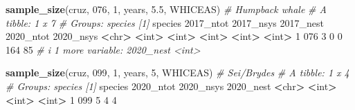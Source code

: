 \documentclass[
]{book}
\newenvironment{Shaded}{\begin{snugshade}}{\end{snugshade}}
\newcommand{\AttributeTok}[1]{\textcolor[rgb]{0.13,0.29,0.53}{#1}}
\newcommand{\CommentTok}[1]{\textcolor[rgb]{0.56,0.35,0.01}{\textit{#1}}}
\newcommand{\DecValTok}[1]{\textcolor[rgb]{0.00,0.00,0.81}{#1}}
\newcommand{\ErrorTok}[1]{\textcolor[rgb]{0.64,0.00,0.00}{\textbf{#1}}}
\newcommand{\FloatTok}[1]{\textcolor[rgb]{0.00,0.00,0.81}{#1}}
\newcommand{\FunctionTok}[1]{\textcolor[rgb]{0.13,0.29,0.53}{\textbf{#1}}}
\newcommand{\NormalTok}[1]{#1}
\newcommand{\SpecialCharTok}[1]{\textcolor[rgb]{0.81,0.36,0.00}{\textbf{#1}}}
\newcommand{\StringTok}[1]{\textcolor[rgb]{0.31,0.60,0.02}{#1}}
\begin{document}
\begin{Shaded}
\begin{Highlighting}[]
\FunctionTok{sample\_size}\NormalTok{(cruz, }\StringTok{\textquotesingle{}076\textquotesingle{}}\NormalTok{, }\DecValTok{1}\NormalTok{, years, }\FloatTok{5.5}\NormalTok{, }\StringTok{\textquotesingle{}WHICEAS\textquotesingle{}}\NormalTok{) }\CommentTok{\# Humpback whale}
\CommentTok{\# A tibble: 1 x 7}
\CommentTok{\# Groups:   species [1]}
\NormalTok{  species }\StringTok{\textasciigrave{}}\AttributeTok{2017\_ntot}\StringTok{\textasciigrave{}} \StringTok{\textasciigrave{}}\AttributeTok{2017\_nsys}\StringTok{\textasciigrave{}} \StringTok{\textasciigrave{}}\AttributeTok{2017\_nest}\StringTok{\textasciigrave{}} \StringTok{\textasciigrave{}}\AttributeTok{2020\_ntot}\StringTok{\textasciigrave{}} \StringTok{\textasciigrave{}}\AttributeTok{2020\_nsys}\StringTok{\textasciigrave{}}
  \SpecialCharTok{\textless{}}\NormalTok{chr}\SpecialCharTok{\textgreater{}}         \ErrorTok{\textless{}}\NormalTok{int}\SpecialCharTok{\textgreater{}}       \ErrorTok{\textless{}}\NormalTok{int}\SpecialCharTok{\textgreater{}}       \ErrorTok{\textless{}}\NormalTok{int}\SpecialCharTok{\textgreater{}}       \ErrorTok{\textless{}}\NormalTok{int}\SpecialCharTok{\textgreater{}}       \ErrorTok{\textless{}}\NormalTok{int}\SpecialCharTok{\textgreater{}}
\DecValTok{1} \DecValTok{076}               \DecValTok{3}           \DecValTok{0}           \DecValTok{0}         \DecValTok{164}          \DecValTok{85}
\CommentTok{\# i 1 more variable: \textasciigrave{}2020\_nest\textasciigrave{} \textless{}int\textgreater{}}

\FunctionTok{sample\_size}\NormalTok{(cruz, }\StringTok{\textquotesingle{}099\textquotesingle{}}\NormalTok{, }\DecValTok{1}\NormalTok{, years, }\DecValTok{5}\NormalTok{, }\StringTok{\textquotesingle{}WHICEAS\textquotesingle{}}\NormalTok{) }\CommentTok{\# Sei/Brydes}
\CommentTok{\# A tibble: 1 x 4}
\CommentTok{\# Groups:   species [1]}
\NormalTok{  species }\StringTok{\textasciigrave{}}\AttributeTok{2020\_ntot}\StringTok{\textasciigrave{}} \StringTok{\textasciigrave{}}\AttributeTok{2020\_nsys}\StringTok{\textasciigrave{}} \StringTok{\textasciigrave{}}\AttributeTok{2020\_nest}\StringTok{\textasciigrave{}}
  \SpecialCharTok{\textless{}}\NormalTok{chr}\SpecialCharTok{\textgreater{}}         \ErrorTok{\textless{}}\NormalTok{int}\SpecialCharTok{\textgreater{}}       \ErrorTok{\textless{}}\NormalTok{int}\SpecialCharTok{\textgreater{}}       \ErrorTok{\textless{}}\NormalTok{int}\SpecialCharTok{\textgreater{}}
\DecValTok{1} \DecValTok{099}               \DecValTok{5}           \DecValTok{4}           \DecValTok{4}


\end{Highlighting}
\end{Shaded}
\end{document}
